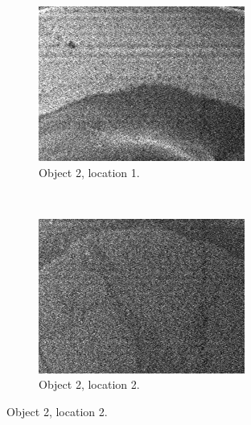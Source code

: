 \documentclass[10pt]{IEEEtran}
\begin{document}
\begin{center}
\begin{figure}[!hbtt]
    \begin{subfigure}[!hbt]{0.25\textwidth}
        \includegraphics[width=\textwidth]{Object2_1}
        \caption{Object 2, location 1.}
        \label{fig:Object2_1}
    \end{subfigure}\quad
    ~ %
    \begin{subfigure}[!hbt]{0.25\textwidth}
        \includegraphics[width=\textwidth]{Object2_2}
        \caption{Object 2, location 2.}
        \label{fig:Object2_2}
    \end{subfigure}\hfill

\end{figure}
\end{center}
\end{document}
